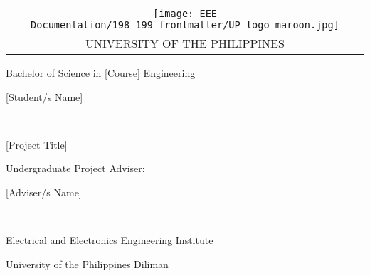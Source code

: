 \newpage
\thispagestyle{empty}

\noindent \begin{center}
\begin{tabular}{c}
\texttt{[image: EEE Documentation/198\_199\_frontmatter/UP\_logo\_maroon.jpg]}\tabularnewline
UNIVERSITY OF THE PHILIPPINES\tabularnewline
\end{tabular}
\par\end{center}

\vspace*{\fill}

\begin{center}
Bachelor of Science in [Course] Engineering
\par\end{center}

\vspace*{\fill}

\begin{center}
[Student/s Name]\\\par
[Student/s Name]\\\par
\end{center}

\begin{center}
[Project Title]
\par\end{center}

\vspace*{\fill}

\begin{center}
Undergraduate Project Adviser:\\\par
\par\end{center}

\begin{center}
[Adviser/s Name]\\\par
[Adviser/s Name]\\\par
\end{center}

\begin{center}
Electrical and Electronics Engineering Institute \\\par
University of the Philippines Diliman
\par\end{center}

